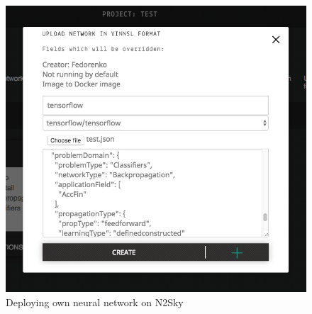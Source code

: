 \documentclass[conference]{IEEEtran}
\begin{document}
\begin{figure}[H]
  \includegraphics[width=\linewidth]{own_nn.png}
  \caption{Deploying own neural network on N2Sky}
  \label{fig:own}
\end{figure}
\end{document}
